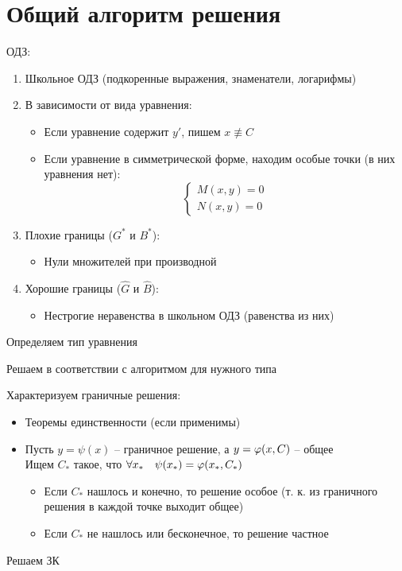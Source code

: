 \chapter{Общий алгоритм решения}

\begin{algo}
	\item ОДЗ:
    \begin{enumerate}
    	\item Школьное ОДЗ (подкоренные выражения, знаменатели, логарифмы)
        \item В зависимости от вида уравнения:
        \begin{itemize}
        	\item Если уравнение содержит $ y' $, пишем $ x \not\equiv C $
            \item Если уравнение в симметрической форме, находим особые точки (в них уравнения нет):
            $$
            \begin{cases}
            	M(x, y) = 0 \\
                N(x, y) = 0
            \end{cases} $$
        \end{itemize}
        \item Плохие границы ($ G^* $ и $ B^* $):
        \begin{itemize}
        	\item Нули множителей при производной
        \end{itemize}
        \item Хорошие границы ($ \hat{G} $ и $ \hat{B} $):
        \begin{itemize}
        	\item Нестрогие неравенства в школьном ОДЗ (равенства из них)
        \end{itemize}
    \end{enumerate}
    \item Определяем тип уравнения
    \item Решаем в соответствии с алгоритмом для нужного типа
    \item Характеризуем граничные решения:
    \begin{itemize}
    	\item Теоремы единственности (если применимы)
        \item Пусть $ y = \psi(x) $ -- граничное решение, а $ y = \varphi(x, C) $ -- общее \\
        Ищем $ C_* $ такое, что $ \forall x_* \quad \psi(x_*) = \varphi(x_*, C_*) $
        \begin{itemize}
        	\item Если $ C_* $ нашлось и конечно, то решение особое (т. к. из граничного решения в каждой точке выходит общее)
            \item Если $ C_* $ не нашлось или бесконечное, то решение частное
        \end{itemize}
    \end{itemize}
    \item Решаем ЗК
\end{algo}

